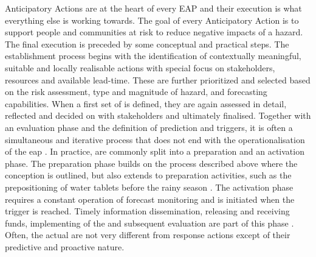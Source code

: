 Anticipatory Actions are at the heart of every EAP and their execution is what everything else is working towards. The goal of every Anticipatory Action is to support people and communities at risk to reduce negative impacts of a hazard. The final execution is preceded by some conceptual and practical steps. The establishment process begins with the identification of contextually meaningful, suitable and locally realisable actions with special focus on stakeholders, resources and available lead-time. These are further prioritized and selected based on the risk assessment, type and magnitude of hazard, and forecasting capabilities. When a first set of  is defined, they are again assessed in detail, reflected and decided on with stakeholders and ultimately finalised. Together with an evaluation phase and the definition of prediction and triggers, it is often a simultaneous and iterative process that does not end with the operationalisation of the \acrshort{eap} \autocite{stephensFORECASTBASEDACTION2015,ifrcGlossaryTermsForecastbased2023,ifrcFbFPractitionersManual2023a,rcrcFORECASTBASEDFINANCINGEARLY2020}.\newline
In practice,  are commonly split into a preparation and an activation phase. The preparation phase builds on the process described above where the conception is outlined, but also extends to preparation activities, such as the prepositioning of water tablets before the rainy season \autocite{stephensFORECASTBASEDACTION2015}. The activation phase requires a constant operation of forecast monitoring and is initiated when the trigger is reached. Timely information dissemination, releasing and receiving funds, implementing of the  and subsequent evaluation are part of this phase \autocite{stephensFORECASTBASEDACTION2015,ifrcFbFPractitionersManual2023a}. Often, the actual  are not very different from response actions except of their predictive and proactive nature. \newline
